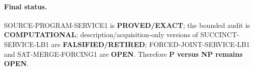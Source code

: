 \documentclass[11pt]{article}
\newcommand{\status}[1]{\textbf{#1}}
\begin{document}
\paragraph{Final status.}
SOURCE-PROGRAM-SERVICE1 is \status{PROVED/EXACT}; the bounded audit is
\status{COMPUTATIONAL}; description/acquisition-only versions of
SUCCINCT-SERVICE-LB1 are \status{FALSIFIED/RETIRED};
FORCED-JOINT-SERVICE-LB1 and SAT-MERGE-FORCING1 are \status{OPEN}.
Therefore \textbf{P versus NP remains OPEN}.

\end{document}
